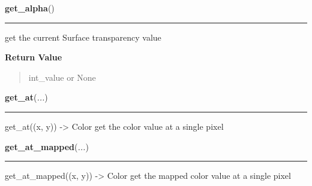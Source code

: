 \hspace{.8\funcindent}\begin{boxedminipage}{\funcwidth}

    \raggedright \textbf{get\_alpha}()

    \vspace{-1.5ex}

    \rule{\textwidth}{0.5\fboxrule}
\setlength{\parskip}{2ex}
    get the current Surface transparency value

\setlength{\parskip}{1ex}
      \textbf{Return Value}
    \vspace{-1ex}

      \begin{quote}
      int\_value or None

      \end{quote}

    \end{boxedminipage}

    \label{pygame:Surface:get_at}

    \vspace{0.5ex}

\hspace{.8\funcindent}\begin{boxedminipage}{\funcwidth}

    \raggedright \textbf{get\_at}(\textit{...})

    \vspace{-1.5ex}

    \rule{\textwidth}{0.5\fboxrule}
\setlength{\parskip}{2ex}
    get\_at((x, y)) -{\textgreater} Color get the color value at a single 
    pixel

\setlength{\parskip}{1ex}
    \end{boxedminipage}

    \label{pygame:Surface:get_at_mapped}

    \vspace{0.5ex}

\hspace{.8\funcindent}\begin{boxedminipage}{\funcwidth}

    \raggedright \textbf{get\_at\_mapped}(\textit{...})

    \vspace{-1.5ex}

    \rule{\textwidth}{0.5\fboxrule}
\setlength{\parskip}{2ex}
    get\_at\_mapped((x, y)) -{\textgreater} Color get the mapped color 
    value at a single pixel

\setlength{\parskip}{1ex}
    \end{boxedminipage}

